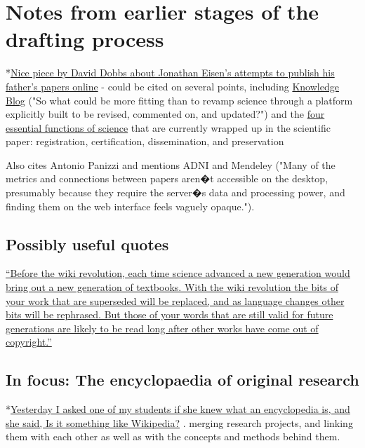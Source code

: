 \documentclass[final,authoryear,3p]{elsarticle-open-drafting}
\begin{document}
\section{Notes from earlier stages of the drafting process}



*\href{http://www.wired.com/wiredscience/2011/05/free-science-one-paper-at-a-time-2/all/1}{Nice piece by David Dobbs about Jonathan Eisen's attempts to publish his father's papers online} - could be cited on several points, including \href{http://knowledgeblog.org/}{Knowledge Blog} ("So what could be more fitting than to revamp science through a platform explicitly built to be revised, commented on, and updated?") and the \href{http://www.ariadne.ac.uk/issue7/fytton/}{four essential functions of science} that are currently wrapped up in the scientific paper: registration, certification, dissemination, and preservation

Also cites Antonio Panizzi and mentions ADNI and Mendeley ("Many of the metrics and connections between papers aren�t accessible on the desktop, presumably because they require the server�s data and processing power, and finding them on the web interface feels vaguely opaque.").

\subsection{Possibly useful quotes}
\href{http://ragesoss.com/blog/2006/11/20/top-10-reasons-why-academics-should-edit-wikipedia/comment-page-1/#comment-17727}{``Before the wiki revolution, each time science advanced a new generation would bring out a new generation of textbooks. With the wiki revolution the bits of your work that are superseded will be replaced, and as language changes other bits will be rephrased. But those of your words that are still valid for future generations are likely to be read long after other works have come out of copyright.''}


\subsection{In focus: The encyclopaedia of original research}

*\href{http://twitter.com/#!/egonwillighagen/statuses/39097468700336128}{Yesterday I asked one of my students if she knew what an encyclopedia is, and she said, Is it something like Wikipedia?}
. merging research projects, and linking them with each other as well as with the concepts and methods behind them.
\end{document}
